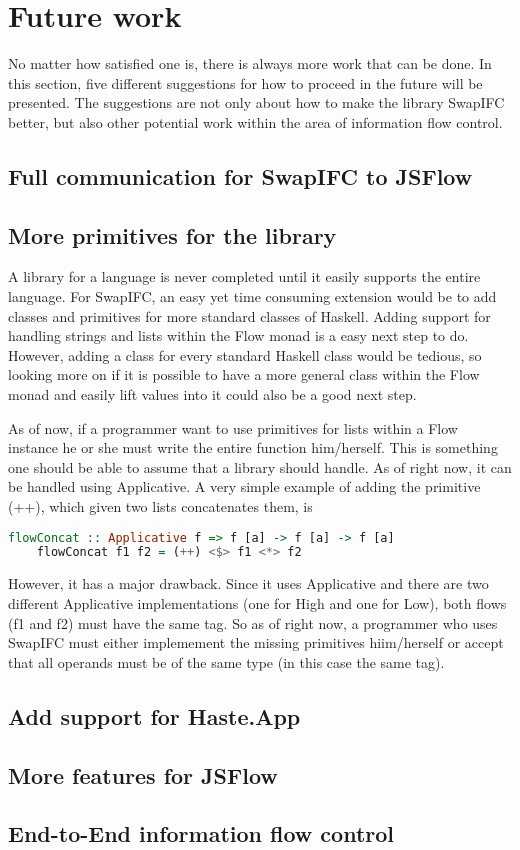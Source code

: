 \section{Future work}
No matter how satisfied one is, there is always more work that can be done. In this section, five different suggestions for how to proceed in the future will be presented. The suggestions are not only about how to make the library SwapIFC better, but also other potential work within the area of information flow control.

\subsection{Full communication for SwapIFC to JSFlow}

\subsection{More primitives for the library}
A library for a language is never completed until it easily supports the entire language. For SwapIFC, an easy yet time consuming extension would be to add classes and primitives for more standard classes of Haskell. Adding support for handling strings and lists within the Flow monad is a easy next step to do. However, adding a class for every standard Haskell class would be tedious, so looking more on if it is possible to have a more general class within the Flow monad and easily lift values into it could also be a good next step.

As of now, if a programmer want to use primitives for lists within a Flow instance he or she must write the entire function him/herself. This is something one should be able to assume that a library should handle. As of right now, it can be handled using Applicative. A very simple example of adding the primitive (++), which given two lists concatenates them, is
\begin{center}
  \begin{lstlisting}[language=Haskell]
    flowConcat :: Applicative f => f [a] -> f [a] -> f [a]
    flowConcat f1 f2 = (++) <$> f1 <*> f2
  \end{lstlisting}
\end{center}
However, it has a major drawback. Since it uses Applicative and there are two different Applicative implementations (one for High and one for Low), both flows (f1 and f2) must have the same tag. So as of right now, a programmer who uses SwapIFC must either implemement the missing primitives hiim/herself or accept that all operands must be of the same type (in this case the same tag).

\subsection{Add support for Haste.App}

\subsection{More features for JSFlow}

\subsection{End-to-End information flow control}
